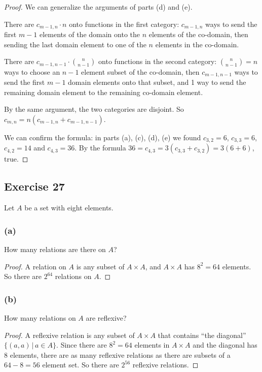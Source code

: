 \documentclass[14pt]{extarticle}
\begin{document}
\begin{proof}
     We can generalize the arguments of parts (d) and (e).

     There are \(c_{m-1,n} \cdot n\) onto functions in the first category: \(c_{m-1,n}\) ways to send the first \(m-1\)
     elements of the domain onto the \(n\) elements of the co-domain, then sending the last domain element to one of the
     \(n\) elements in the co-domain.

     There are \(c_{m-1,n-1} \cdot \binom{n}{n-1}\) onto functions in the second category: \(\binom{n}{n-1} = n\) ways to choose
     an \(n-1\) element subset of the co-domain, then \(c_{m-1,n-1}\) ways to send the first \(m-1\) domain elements onto that
     subset, and 1 way to send the remaining domain element to the remaining co-domain element.

     By the same argument, the two categories are disjoint. So \(c_{m,n} = n(c_{m-1,n} + c_{m-1,n-1})\).

     We can confirm the formula: in parts (a), (c), (d), (e) we found \(c_{3,2} = 6\), \(c_{3,3} = 6\), \(c_{4,2} = 14\) and
     \(c_{4,3} = 36\). By the formula \(36 = c_{4,3} = 3(c_{3,3} + c_{3,2}) = 3(6+6)\), true.
\end{proof}

\subsection{Exercise 27}
Let \(A\) be a set with eight elements.

\subsubsection{(a)}
How many relations are there on \(A\)?

\begin{proof}
     A relation on \(A\) is any subset of \(A \times A\), and \(A \times A\) has \(8^2 = 64\) elements. So there are \(2^{64}\)
     relations on \(A\).
\end{proof}

\subsubsection{(b)}
How many relations on \(A\) are reflexive?

\begin{proof}
     A reflexive relation is any subset of \(A \times A\) that contains ``the diagonal'' \(\{(a,a) \,|\, a \in A\}\). Since
     there are \(8^2 = 64\) elements in \(A \times A\) and the diagonal has 8 elements, there are as many reflexive relations
     as there are subsets of a \(64-8 = 56\) element set. So there are \(2^{56}\) reflexive relations.
\end{proof}
\end{document}

